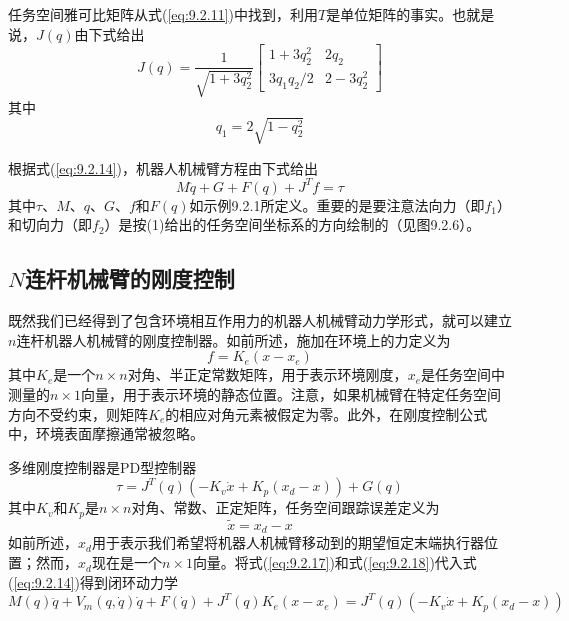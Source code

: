 \documentclass[12pt,a4paper]{ctexart}
\begin{document}
任务空间雅可比矩阵从式(\ref{eq:9.2.11})中找到，利用$T$是单位矩阵的事实。也就是说，$J(q)$由下式给出
\begin{equation}
J(q) = \frac{1}{\sqrt{1 + 3q_2^2}} \begin{bmatrix} 1 + 3q_2^2 & 2q_2 \\ 3q_1q_2/2 & 2 - 3q_2^2 \end{bmatrix}
\end{equation}
其中
\[
q_1 = 2\sqrt{1 - q_2^2}
\]

根据式(\ref{eq:9.2.14})，机器人机械臂方程由下式给出
\begin{equation}
M\ddot{q} + G + F(q) + J^T f = \tau
\end{equation}
其中$\tau$、$M$、$q$、$G$、$f$和$F(q)$如示例9.2.1所定义。重要的是要注意法向力（即$f_1$）和切向力（即$f_2$）是按(1)给出的任务空间坐标系的方向绘制的（见图9.2.6）。

\subsection{$N$连杆机械臂的刚度控制}

既然我们已经得到了包含环境相互作用力的机器人机械臂动力学形式，就可以建立$n$连杆机器人机械臂的刚度控制器。如前所述，施加在环境上的力定义为
\begin{equation}\label{eq:9.2.17}
f = K_e(x - x_e)
\end{equation}
其中$K_e$是一个$n \times n$对角、半正定常数矩阵，用于表示环境刚度，$x_e$是任务空间中测量的$n \times 1$向量，用于表示环境的静态位置。注意，如果机械臂在特定任务空间方向不受约束，则矩阵$K_e$的相应对角元素被假定为零。此外，在刚度控制公式中，环境表面摩擦通常被忽略。

多维刚度控制器是PD型控制器
\begin{equation}\label{eq:9.2.18}
\tau = J^T(q)(-K_v\dot{x} + K_p(x_d - x)) + G(q)
\end{equation}
其中$K_v$和$K_p$是$n \times n$对角、常数、正定矩阵，任务空间跟踪误差定义为
\[
\tilde{x} = x_d - x
\]
如前所述，$x_d$用于表示我们希望将机器人机械臂移动到的期望恒定末端执行器位置；然而，$x_d$现在是一个$n \times 1$向量。将式(\ref{eq:9.2.17})和式(\ref{eq:9.2.18})代入式(\ref{eq:9.2.14})得到闭环动力学
\begin{equation}\label{eq:9.2.19}
M(q)\ddot{q} + V_m(q, \dot{q})\dot{q} + F(\dot{q}) + J^T(q)K_e(x - x_e) = J^T(q)(-K_v\dot{x} + K_p(x_d - x))
\end{equation}
\end{document}
